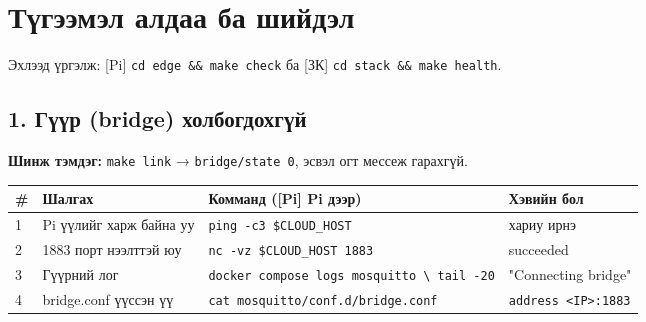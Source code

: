 \chapter{Түгээмэл алдаа ба шийдэл}

Эхлээд үргэлж: {[}Pi{]} \texttt{cd\ edge\ \&\allowbreak{}\&\allowbreak{}\ make\ check} ба {[}ЗК{]} \texttt{cd\ stack\ \&\allowbreak{}\&\allowbreak{}\ make\ health}.

\hypertarget{ux433ux4afux4afux440-bridge-ux445ux43eux43bux431ux43eux433ux434ux43eux445ux433ux4afux439}{%
\section{1. Гүүр (bridge) холбогдохгүй}\label{ux433ux4afux4afux440-bridge-ux445ux43eux43bux431ux43eux433ux434ux43eux445ux433ux4afux439}}

\textbf{Шинж тэмдэг:} \texttt{make\ link} → \texttt{bridge/state\ 0}, эсвэл огт мессеж гарахгүй.

\begingroup\scriptsize\begin{longtable}[]{@{}llll@{}}
\toprule
\# & Шалгах & Комманд ({[}Pi{]} Pi дээр) & Хэвийн бол\tabularnewline
\midrule
\endhead
1 & Pi үүлийг харж байна уу & \texttt{ping\ -c3\ \$CLOUD\_\allowbreak{}HOST} & хариу ирнэ\tabularnewline
2 & 1883 порт нээлттэй юу & \texttt{nc\ -vz\ \$CLOUD\_\allowbreak{}HOST\ 1883} & succeeded\tabularnewline
3 & Гүүрний лог & \texttt{docker\ compose\ logs\ mosquitto\ \textbackslash{}\textbar{}\ tail\ -20} & "Connecting bridge"\tabularnewline
4 & bridge.conf үүссэн үү & \texttt{cat\ mosquitto/\allowbreak{}conf.\allowbreak{}d/\allowbreak{}bridge.\allowbreak{}conf} & \texttt{address\ \textless{}IP\textgreater{}:\allowbreak{}1883}\tabularnewline
\bottomrule
\end{longtable}\endgroup

